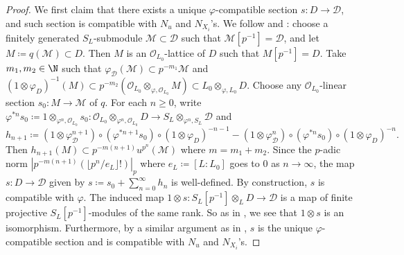 \begin{proof}
We first claim that there exists a unique $\varphi$-compatible section $s\colon D \rightarrow \mathscr{D}$, and such section is compatible with $N_u$ and $N_{X_i}$'s. We follow \cite[Lem.~1.2.6, Pf.]{kisin-crystalline} and \cite[Lem.~3.14]{kim-groupscheme-relative}: choose a finitely generated $S_L$-submodule $\mathscr{M} \subset \mathscr{D}$ such that $\mathscr{M}[p^{-1}] = \mathscr{D}$, and let $M \coloneqq q(\mathscr{M}) \subset D$. Then $M$ is an $\mathcal{O}_{L_0}$-lattice of $D$ such that $M[p^{-1}] = D$. Take  $m_1, m_2\in\N$ such that $\varphi_{\mathscr{D}}(\mathscr{M}) \subset p^{-m_1}\mathscr{M}$ and $(1\otimes\varphi_D)^{-1} (M) \subset p^{-m_2}( \mathcal{O}_{L_0}\otimes_{\varphi, \mathcal{O}_{L_0}} M) \subset L_0\otimes_{\varphi, L_0} D$. Choose any $\mathcal{O}_{L_0}$-linear section $s_0\colon M \rightarrow \mathscr{M}$ of $q$. For each $n \geq 0$, write $\varphi^{* n} s_0 \coloneqq 1 \otimes_{\varphi^n, \mathcal{O}_{L_0}} s_0 \colon \mathcal{O}_{L_0}\otimes_{\varphi^n, \mathcal{O}_{L_0}} D \rightarrow S_L\otimes_{\varphi^n, S_L} \mathscr{D}$ and
\[
h_{n+1}\coloneqq (1\otimes\varphi_{\mathscr{D}}^{n+1})\circ (\varphi^{* n+1}s_0)\circ (1\otimes\varphi_D)^{-n-1} - (1\otimes\varphi_{\mathscr{D}}^{n})\circ (\varphi^{* n}s_0)\circ (1\otimes\varphi_D)^{-n}.
\]
Then $h_{n+1}(M) \subset p^{-m(n+1)}u^{p^n}(\mathscr{M})$ where $m = m_1+m_2$. Since the $p$-adic norm $\displaystyle |p^{-m(n+1)} (\lfloor p^n/e_L \rfloor!) |_p$ where $e_L \coloneqq [L:L_0]$ goes to $0$ as $n \rightarrow \infty$, the map $s \colon D \rightarrow \mathscr{D}$ given by $s\coloneqq s_0+\sum_{n=0}^{\infty} h_n$ is well-defined. By construction, $s$ is compatible with $\varphi$. The induced map $1\otimes s\colon S_L[p^{-1}]\otimes_{L} D \rightarrow \mathscr{D}$ is a map of finite projective $S_L[p^{-1}]$-modules of the same rank. So as in \cite[Lem.~4.19, Pf.]{moon-strly-div-latt-cryst-cohom-CDVF}, we see that $1\otimes s$ is an isomorphism. Furthermore, by a similar argument as in \cite[Lem.~3.14, Pf.]{kim-groupscheme-relative}, $s$ is the unique $\varphi$-compatible section and is compatible with $N_u$ and $N_{X_i}$'s. 


\end{proof}

